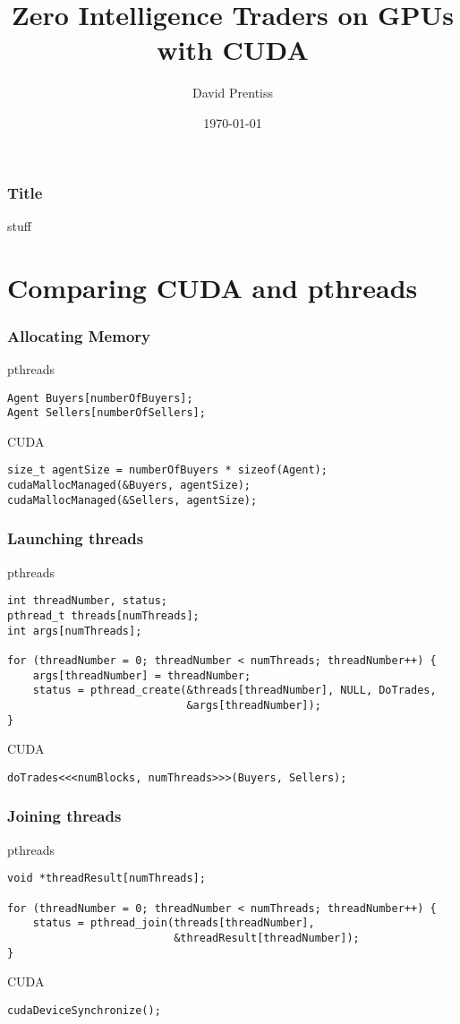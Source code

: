 \documentclass{beamer}
\begin{document}
\title{Zero Intelligence Traders on GPUs with CUDA}
\author{David Prentiss}
\date{\today}


\frame{\titlepage}

\begin{frame}
  \frametitle{Title}
  stuff
\end{frame}

\section{Comparing CUDA and pthreads}
\begin{frame}[fragile]
  \frametitle{Allocating Memory}
  pthreads
\begin{lstlisting}[frame=single]
Agent Buyers[numberOfBuyers];
Agent Sellers[numberOfSellers];
\end{lstlisting}

  CUDA
\begin{lstlisting}[frame=single]
size_t agentSize = numberOfBuyers * sizeof(Agent);
cudaMallocManaged(&Buyers, agentSize);
cudaMallocManaged(&Sellers, agentSize);
\end{lstlisting}
\end{frame}

\begin{frame}[fragile]
  \frametitle{Launching threads}
  pthreads
\begin{lstlisting}[frame=single]
int threadNumber, status;
pthread_t threads[numThreads];
int args[numThreads];

for (threadNumber = 0; threadNumber < numThreads; threadNumber++) {
    args[threadNumber] = threadNumber;
    status = pthread_create(&threads[threadNumber], NULL, DoTrades,
                            &args[threadNumber]);
}
\end{lstlisting}

  CUDA
\begin{lstlisting}[frame=single]
doTrades<<<numBlocks, numThreads>>>(Buyers, Sellers);
\end{lstlisting}
\end{frame}

\begin{frame}[fragile]
  \frametitle{Joining threads}
  pthreads
\begin{lstlisting}[frame=single]
void *threadResult[numThreads];

for (threadNumber = 0; threadNumber < numThreads; threadNumber++) {
    status = pthread_join(threads[threadNumber],
                          &threadResult[threadNumber]);
}
\end{lstlisting}

  CUDA
\begin{lstlisting}[frame=single]
cudaDeviceSynchronize();
\end{lstlisting}
\end{frame}
\end{document}
